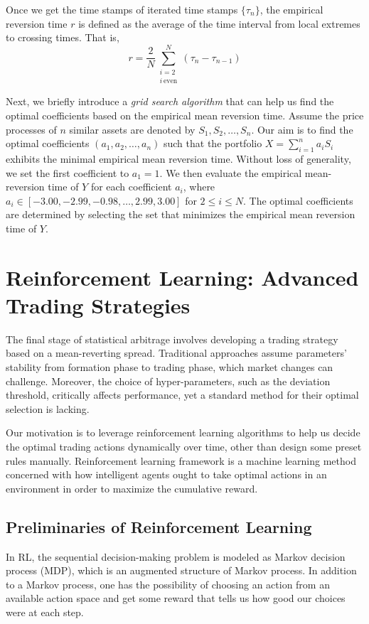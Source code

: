 \documentclass{article}
\begin{document}
Once we get the time stamps of iterated time stamps $\{\tau_n\}$, the empirical reversion time $r$ is defined as the average of the time interval from local extremes to crossing times. That is,
$$
r = \frac{2}{N} \sum_{\substack{i=2 \\ i \, \text{even}}}^{N} (\tau_n - \tau_{n-1})  
$$

Next, we briefly introduce a \textit{grid search algorithm} that can help us find the optimal coefficients based on the empirical mean reversion time.
Assume the price processes of $n$ similar assets are denoted by $S_1, S_2, \ldots, S_n$. Our aim is to find the optimal coefficients $(a_1, a_2, \ldots, a_n)$ such that the portfolio $X=\sum_{i=1}^n a_i S_i$ exhibits the minimal empirical mean reversion time. Without loss of generality, we set the first coefficient to $a_1 = 1$. We then evaluate the empirical mean-reversion time of $Y$ for each coefficient $a_i$, where $a_i \in [-3.00, -2.99, -0.98, \ldots, 2.99, 3.00]$ for $2 \leq i \leq N$. The optimal coefficients are determined by selecting the set that minimizes the empirical mean reversion time of $Y$.


\section{Reinforcement Learning: Advanced Trading Strategies}
\label{sec4}
The final stage of statistical arbitrage involves developing a trading strategy based on a mean-reverting spread. Traditional approaches assume parameters' stability from formation phase to trading phase, which market changes can challenge. Moreover, the choice of hyper-parameters, such as the deviation threshold, critically affects performance, yet a standard method for their optimal selection is lacking.

Our motivation is to leverage reinforcement learning algorithms to help us decide the optimal trading actions dynamically over time, other than design some preset rules manually. Reinforcement learning framework is a machine learning method concerned with how intelligent agents ought to take optimal actions in an environment in order to maximize the cumulative reward. 

\subsection{Preliminaries of Reinforcement Learning}
In RL, the sequential decision-making problem is modeled as Markov decision process (MDP), which is an augmented structure of Markov process. In addition to a Markov process, one has the possibility of choosing an action from an available action space and get some reward that tells us how good our choices were at each step. 
\end{document}

